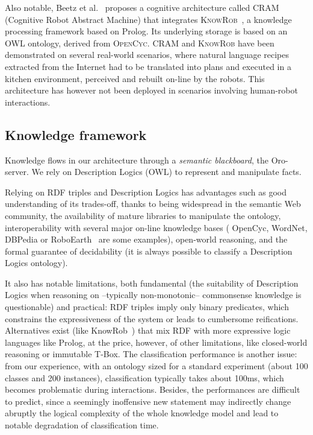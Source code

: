 \documentclass[preprint,3p,times]{elsarticle}
\begin{document}
Also notable, Beetz et al.~\cite{Beetz2010} proposes a cognitive architecture
called \textsc{CRAM} (Cognitive Robot Abstract Machine) that integrates
\textsc{KnowRob}~\cite{Tenorth2009a}, a knowledge processing framework based on
Prolog. Its underlying storage is based on an OWL ontology, derived from
\textsc{OpenCyc}. \textsc{CRAM} and \textsc{KnowRob} have been demonstrated on
several real-world scenarios, where natural language recipes extracted from the
Internet had to be translated into plans and executed in a kitchen environment,
perceived and rebuilt on-line by the robots. This architecture has however not
been deployed in scenarios involving human-robot interactions.

\subsection{Knowledge framework}
\label{krs-discussion}

Knowledge flows in our architecture through a \emph{semantic blackboard}, the
{\sc Oro}-server. We rely on Description Logics (OWL) to represent and
manipulate facts.

Relying on RDF triples and Description Logics has advantages such as good
understanding of its trades-off, thanks to being widespread in the semantic Web
community, the availability of mature libraries to manipulate the ontology,
interoperability with several major on-line knowledge bases ({\sc
OpenCyc}, {\sc WordNet}, {\sc DBPedia} or {\sc RoboEarth}~\cite{Waibel2011} are
some examples), open-world reasoning, and the formal guarantee of decidability
(it is always possible to classify a Description Logics ontology).

It also has notable limitations, both fundamental (the suitability of
Description Logics when reasoning on --typically non-monotonic-- commonsense
knowledge is questionable) and practical: RDF triples imply only binary
predicates, which constrains the expressiveness of the system or leads to
cumbersome reifications. Alternatives exist (like {\sc
KnowRob}~\cite{Tenorth2009a}) that mix RDF with more expressive logic languages
like {\sc Prolog}, at the price, however, of other limitations, like
closed-world reasoning or immutable T-Box. The classification performance is
another issue: from our experience, with an ontology sized for a standard
experiment (about 100 classes and 200 instances), classification typically
takes about 100ms, which becomes problematic during interactions.  Besides, the
performances are difficult to predict, since a seemingly inoffensive new
statement may indirectly change abruptly the logical complexity of the whole
knowledge model and lead to notable degradation of classification time.
\end{document}
